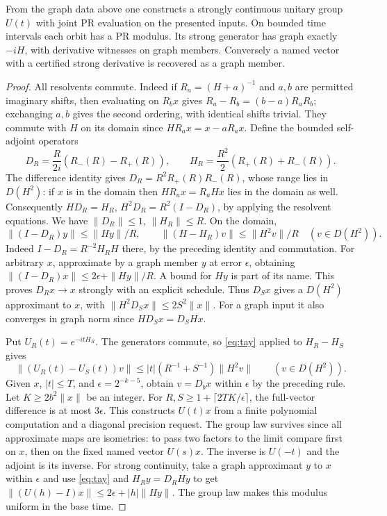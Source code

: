 \begin{theorem}\label{thm:stone-forward}
From the graph data above one constructs a strongly continuous unitary group $U(t)$ with joint PR evaluation on the presented inputs. On bounded time intervals each orbit has a PR modulus. Its strong generator has graph exactly $-iH$, with derivative witnesses on graph members. Conversely a named vector with a certified strong derivative is recovered as a graph member.
\end{theorem}
\begin{proof}
All resolvents commute. Indeed if $R_a=(H+a)^{-1}$ and $a,b$ are permitted imaginary shifts, then evaluating on $R_bx$ gives $R_a-R_b=(b-a)R_aR_b$; exchanging $a,b$ gives the second ordering, with identical shifts trivial. They commute with $H$ on its domain since $HR_a x=x-aR_a x$. Define the bounded self-adjoint operators
\[
 D_R=\frac R{2i}(R_-(R)-R_+(R)),\qquad H_R=\frac{R^2}{2}(R_+(R)+R_-(R)).
\]
The difference identity gives $D_R=R^2 R_+(R)R_-(R)$, whose range lies in $D(H^2)$: if $x$ is in the domain then $HR_a x=R_a Hx$ lies in the domain as well. Consequently $HD_R=H_R$, $H^2D_R=R^2(I-D_R)$, by applying the resolvent equations. We have $\|D_R\|\le1$, $\|H_R\|\le R$. On the domain,
\begin{equation}
 \|(I-D_R)y\|\le\|Hy\|/R,\qquad
 \|(H-H_R)v\|\le\|H^2v\|/R\quad(v\in D(H^2)).\label{eq:yosi}
\end{equation}
Indeed $I-D_R=R^{-2}H_R H$ there, by the preceding identity and commutation. For arbitrary $x$, approximate by a graph member $y$ at error $\epsilon$, obtaining $\|(I-D_R)x\|\le 2\epsilon+\|Hy\|/R$. A bound for $Hy$ is part of its name. This proves $D_Rx\to x$ strongly with an explicit schedule. Thus $D_Sx$ gives a $D(H^2)$ approximant to $x$, with $\|H^2D_Sx\|\le2S^2\|x\|$. For a graph input it also converges in graph norm since $HD_S x=D_S Hx$.

Put $U_R(t)=e^{-itH_R}$. The generators commute, so \eqref{eq:tay} applied to $H_R-H_S$ gives
\[
 \|(U_R(t)-U_S(t))v\|\le |t|(R^{-1}+S^{-1})\|H^2v\|\qquad(v\in D(H^2)).
\]
Given $x$, $|t|\le T$, and $\epsilon=2^{-k-5}$, obtain $v=D_bx$ within $\epsilon$ by the preceding rule. Let $K\ge 2b^2\|x\|$ be an integer. For $R,S\ge1+\lceil 2TK/\epsilon\rceil$, the full-vector difference is at most $3\epsilon$. This constructs $U(t)x$ from a finite polynomial computation and a diagonal precision request. The group law survives since all approximate maps are isometries: to pass two factors to the limit compare first on $x$, then on the fixed named vector $U(s)x$. The inverse is $U(-t)$ and the adjoint is its inverse. For strong continuity, take a graph approximant $y$ to $x$ within $\epsilon$ and use \eqref{eq:tay} and $H_R y=D_R Hy$ to get $\|(U(h)-I)x\|\le2\epsilon+|h|\|Hy\|$. The group law makes this modulus uniform in the base time.


\end{proof}
